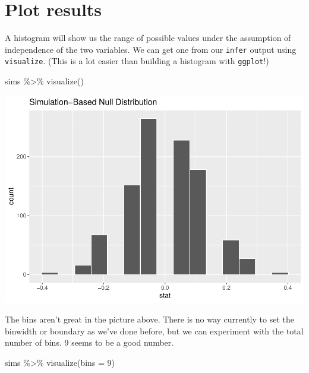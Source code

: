 \documentclass[
]{book}
\newenvironment{Shaded}{\begin{snugshade}}{\end{snugshade}}
\newcommand{\AttributeTok}[1]{\textcolor[rgb]{0.77,0.63,0.00}{#1}}
\newcommand{\DecValTok}[1]{\textcolor[rgb]{0.00,0.00,0.81}{#1}}
\newcommand{\FunctionTok}[1]{\textcolor[rgb]{0.00,0.00,0.00}{#1}}
\newcommand{\NormalTok}[1]{#1}
\newcommand{\SpecialCharTok}[1]{\textcolor[rgb]{0.00,0.00,0.00}{#1}}
\begin{document}
\hypertarget{randomization2-plot}{%
\section{Plot results}\label{randomization2-plot}}

A histogram will show us the range of possible values under the assumption of independence of the two variables. We can get one from our \texttt{infer} output using \texttt{visualize}. (This is a lot easier than building a histogram with \texttt{ggplot}!)

\begin{Shaded}
\begin{Highlighting}[]
\NormalTok{sims }\SpecialCharTok{\%\textgreater{}\%}
    \FunctionTok{visualize}\NormalTok{()}
\end{Highlighting}
\end{Shaded}

\includegraphics{intro_stats_files/figure-latex/unnamed-chunk-254-1.pdf}

The bins aren't great in the picture above. There is no way currently to set the binwidth or boundary as we've done before, but we can experiment with the total number of bins. 9 seems to be a good number.

\begin{Shaded}
\begin{Highlighting}[]
\NormalTok{sims }\SpecialCharTok{\%\textgreater{}\%}
    \FunctionTok{visualize}\NormalTok{(}\AttributeTok{bins =} \DecValTok{9}\NormalTok{)}
\end{Highlighting}
\end{Shaded}
\end{document}
